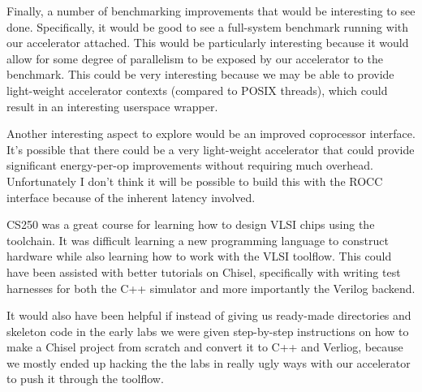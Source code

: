 \documentclass[twocolumn]{article}
\begin{document}
Finally, a number of benchmarking improvements that would be
interesting to see done.  Specifically, it would be good to see a
full-system benchmark running with our accelerator attached.  This
would be particularly interesting because it would allow for some
degree of parallelism to be exposed by our accelerator to the
benchmark.  This could be very interesting because we may be able to
provide light-weight accelerator contexts (compared to POSIX threads),
which could result in an interesting userspace wrapper.

Another interesting aspect to explore would be an improved coprocessor
interface.  It's possible that there could be a very light-weight
accelerator that could provide significant energy-per-op improvements
without requiring much overhead.  Unfortunately I don't think it will
be possible to build this with the ROCC interface because of the
inherent latency involved.

CS250 was a great course for learning how to design VLSI chips using
the toolchain. It was difficult learning a new programming language to
construct hardware while also learning how to work with the VLSI
toolflow. This could have been assisted with better tutorials on
Chisel, specifically with writing test harnesses for both the C++
simulator and more importantly the Verilog backend.

It would also have been helpful if instead of giving us ready-made
directories and skeleton code in the early labs we were given
step-by-step instructions on how to make a Chisel project from scratch
and convert it to C++ and Verliog, because we mostly ended up hacking
the the labs in really ugly ways with our accelerator to push it
through the toolflow.



\end{document}

